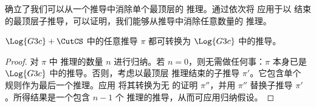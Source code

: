 \documentclass[../../../include/open-logic-section]{subfiles}
\begin{document}
 确立了我们可以从一个推导中消除单个最顶层的 \CutCS{} 推理。通过依次将  应用于以 \CutCS{} 结束的最顶层子推导，可以证明，我们能够从推导中消除任意数量的 \CutCS{} 推理。

\begin{thm}
$\Log{G3c} + \CutCS$ 中的任意推导 $\pi$ 都可转换为 $\Log{G3c}$ 中的推导。
\end{thm}

\begin{proof}
对 $\pi$ 中 \CutCS{} 推理的数量 $n$ 进行归纳。若 $n=0$，则无需做任何事：$\pi$ 本身已是 $\Log{G3c}$ 中的推导。否则，考虑以最顶层 \CutCS{} 推理结束的子推导 $\pi'$。它包含单个 \CutCS{} 规则作为最后一个推理。应用  将其转换为无 \CutCS{} 的证明 $\pi''$，并用 $\pi''$ 替换子推导 $\pi'$。所得结果是一个包含 $n-1$ 个 \CutCS{} 推理的推导，从而可应用归纳假设。
\end{proof}
\end{document}
